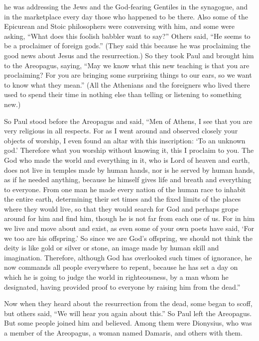 {he was addressing
the Jews
and
the God-fearing Gentiles
in
the synagogue,
and
in
the marketplace
every
day
those who happened to be there.
Also
some
of the Epicurean
and
Stoic
philosophers
were conversing with
him,
and
some
were asking, “What
does
this foolish babbler
want
to say?” Others said,
“He seems
to be
a proclaimer
of foreign
gods.”
(They said this because
he was proclaiming the good news
about Jesus
and
the resurrection.)
So
they took
Paul
and brought
him to the Areopagus,
saying,
“May we
know
what
this
new
teaching
is that you
are proclaiming?
For
you are bringing
some surprising things
to
our
ears,
so
we want
to know
what
they mean.”
(All
the Athenians
and the foreigners
who lived there
used to spend
their time
in
nothing
else
than
telling
or
listening
to something
new.)
\par }{\PP {}So
Paul
stood
before
the Areopagus
and said,
“Men
of Athens,
I see
that you
are very religious
in
all respects.
For
as
I went around
and
observed closely
your
objects of worship,
I
even
found
an altar
with
this
inscription: ‘To an unknown
god.’
Therefore
what you worship
without knowing
it, this
I
proclaim
to you.
The God
who made
the world
and
everything
in
it,
who is
Lord
of heaven
and
earth,
does
not
live
in
temples
made by human hands,
nor
is he served
by
human
hands,
as if he needed
anything,
because he himself gives
life
and
breath
and
everything
to everyone.
From
one
man he made
every
nation
of
the human race
to inhabit
the entire
earth,
determining
their set times
and
the fixed limits
of the places where they
would live,
so that they would search
for God
and perhaps
grope around
for him
and
find
him, though
he is
not
far
from
each
one
of us.
For
in
him
we live
and
move about
and
exist,
as
even
some
of
your own
poets
have said,
‘For
we
too
are
his offspring.’
So
since we are
God’s
offspring,
we should
not
think
the deity
is
like
gold
or
silver
or
stone,
an image
made by human
skill
and
imagination.
Therefore,
although God
has overlooked
such times
of ignorance,
he
now
commands
all
people
everywhere
to repent,
because
he has set
a day
on
which
he is going
to judge
the world
in
righteousness,
by
a man
whom
he designated,
having provided
proof
to everyone
by raising
him
from
the dead.”
\par }{\PP {}Now when
they heard
about the resurrection
from
the dead,
some began to scoff,
but
others said,
“We will hear
you
again
about
this.”
So
Paul
left the Areopagus.
But
some
people
joined
him
and believed.
Among
them
were Dionysius,
who was a member of the Areopagus,
a woman
named
Damaris,
and
others
with
them.

}
